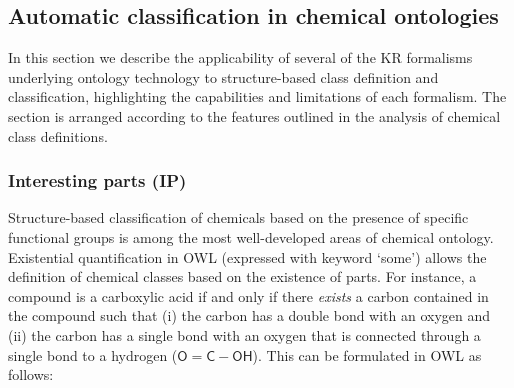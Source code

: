 \documentclass[10pt]{bmc_article}
\newenvironment{bmcformat}{\baselineskip20pt\sloppy\setboolean{publ}{false}}{\baselineskip20pt\sloppy}
\begin{document}
\begin{bmcformat}
\subsection*{Automatic classification in chemical ontologies}
\label{sec:resultschemontology}

In this section we describe the applicability of several of the KR formalisms underlying ontology technology to structure-based class definition and classification, highlighting the capabilities and limitations of each formalism. The section is arranged according to the features outlined in the analysis of chemical class definitions.

% 


\subsubsection*{Interesting parts (IP)}


Structure-based classification of chemicals based on the presence of specific functional groups is among the most well-developed areas of chemical ontology. Existential quantification in OWL (expressed with keyword `some') allows the definition of chemical classes based on the existence of parts. For instance, a compound is a carboxylic acid if and only if there \emph{exists} a carbon contained in the compound such that (i) the carbon has a double bond with an oxygen and (ii) the carbon has a single bond with an oxygen that is connected through a single bond to a hydrogen ($\mathsf{O=C-OH}$). This can be formulated in OWL as follows:

%


\end{bmcformat}
\end{document}
